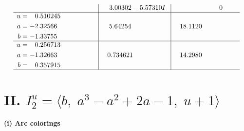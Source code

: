 \documentclass[1p]{elsarticle_modified}
\theoremstyle{definition}
\begin{document}
$$\begin{array}{c|c|c}
 & \phantom{-}3.00302 - 5.57310 I & \phantom{-0.000000 } 0 \\ \hline\begin{aligned}
u &= \phantom{-}0.510245\phantom{ +0.000000I} \\
a &= -2.32566\phantom{ +0.000000I} \\
b &= -1.33755\phantom{ +0.000000I}\end{aligned}
 & \phantom{-}5.64254\phantom{ +0.000000I} & \phantom{-}18.1120\phantom{ +0.000000I} \\ \hline\begin{aligned}
u &= \phantom{-}0.256713\phantom{ +0.000000I} \\
a &= -1.32663\phantom{ +0.000000I} \\
b &= \phantom{-}0.357915\phantom{ +0.000000I}\end{aligned}
 & \phantom{-}0.734621\phantom{ +0.000000I} & \phantom{-}14.2980\phantom{ +0.000000I}\\
 \hline 
 \end{array}$$\newpage\newpage\renewcommand{\arraystretch}{1}
\centering \section*{II. $I^u_{2}= \langle b,\;a^3- a^2+2 a-1,\;u+1 \rangle$}
\flushleft \textbf{(i) Arc colorings}\\
\end{document}
